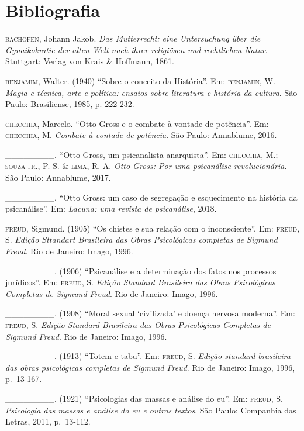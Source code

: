 \section{Bibliografia}

\begin{Parskip}
\textsc{bachofen}, Johann Jakob. \emph{Das Mutterrecht: eine Untersuchung über die Gynaikokratie der alten Welt nach ihrer religiösen und rechtlichen Natur}. Stuttgart: Verlag von Krais \& Hoffmann, 1861.

\textsc{benjamim}, Walter. (1940) ``Sobre o conceito da História''. Em: \textsc{benjamin}, W. \emph{Magia e técnica, arte e política: ensaios sobre literatura e história da cultura}. São Paulo: Brasiliense, 1985, p. 222-232.

\textsc{checchia}, Marcelo. ``Otto Gross e o combate à vontade de potência''. Em: \textsc{checchia}, M. \emph{Combate à vontade de potência}. São Paulo: Annablume, 2016.

\_\_\_\_\_\_\_\_. ``Otto Gross, um psicanalista anarquista''. Em: \textsc{checchia}, M.; \textsc{souza jr.}, P. S. \& \textsc{lima}, R. A. \emph{Otto Gross: Por uma psicanálise revolucionária}. São Paulo: Annablume, 2017.

\_\_\_\_\_\_\_\_. ``Otto Gross: um caso de segregação e esquecimento na história da psicanálise''. Em: \emph{Lacuna: uma revista de psicanálise}, 2018.

\textsc{freud}, Sigmund. (1905) ``Os chistes e sua relação com o inconsciente''. Em: \textsc{freud}, S. \emph{Edição Sttandart Brasileira das Obras Psicológicas completas de Sigmund Freud}. Rio de Janeiro: Imago, 1996.

\_\_\_\_\_\_\_\_. (1906) ``Psicanálise e a determinação dos fatos nos processos jurídicos''. Em: \textsc{freud}, S. \emph{Edição Standard Brasileira das Obras Psicológicas Completas de Sigmund Freud}. Rio de Janeiro: Imago, 1996.

\_\_\_\_\_\_\_\_. (1908) ``Moral sexual `civilizada' e doença nervosa moderna''. Em: \textsc{freud}, S. \emph{Edição Standard Brasileira das Obras Psicológicas Completas de Sigmund Freud}. Rio de Janeiro: Imago, 1996.

\_\_\_\_\_\_\_\_. (1913) ``Totem e tabu''. Em: \textsc{freud}, S. \emph{Edição standard brasileira das obras psicológicas completas de Sigmund Freud}. Rio de Janeiro: Imago, 1996, p.~13-167.

\_\_\_\_\_\_\_\_. (1921) ``Psicologias das massas e análise do eu''. Em: \textsc{freud}, S. \emph{Psicologia das massas e análise do eu e outros textos}. São Paulo: Companhia das Letras, 2011, p.~13-112.


\end{Parskip}
